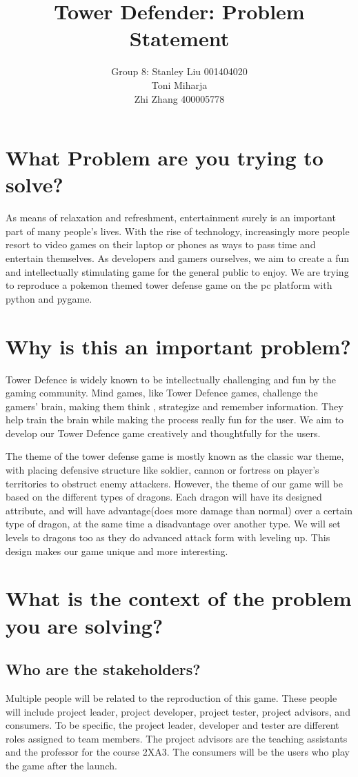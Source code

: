 \documentclass[12pt]{article}
\title{Tower Defender: Problem Statement}
\author{Group 8: Stanley Liu 001404020\\    
                 Toni Miharja\\
                 Zhi Zhang 400005778}
\begin{document}
\maketitle

\section {What Problem are you trying to solve?}
As means of relaxation and refreshment, entertainment surely is an important part of many people’s lives. With the rise of technology, increasingly more people resort to video games on their laptop or phones as ways to pass time and entertain themselves. As developers and gamers ourselves, we aim to create a fun and intellectually stimulating game for the general public to enjoy. We are trying to reproduce a pokemon themed tower defense game on the pc platform with python and pygame.

\section {Why is this an important problem?}
Tower Defence is widely known to be intellectually challenging and fun by the gaming community. Mind games, like Tower Defence games, challenge the gamers’ brain, making them think , strategize and remember information. They help train the brain while making the process really fun for the user. We aim to develop  our Tower Defence game creatively and thoughtfully for the users.

The theme of the tower defense game is mostly known as the classic war theme, with placing defensive structure like soldier, cannon or fortress on player’s territories to obstruct enemy attackers. However, the theme of our game will be based on the different types of dragons. Each dragon will have its designed attribute, and will have advantage(does more damage than normal) over a certain type of dragon, at the same time a disadvantage over another type. We will set levels to dragons too as they do advanced attack form with leveling up. This design makes our game unique and more interesting.
\section {What is the context of the problem you are solving?}
    \subsection {Who are the stakeholders?}
    Multiple people will be related to the reproduction of this game. These people will include project leader, project developer, project tester, project advisors, and consumers. To be specific, the project leader, developer and tester are different roles assigned to team members. The project advisors are the teaching assistants and the professor for the course 2XA3. The consumers will be the users who play the game after the launch.
\end{document}
